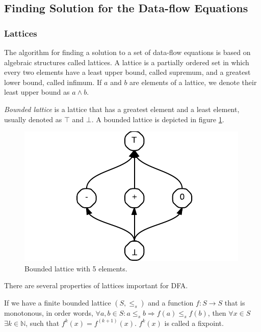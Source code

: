         \subsection{Finding Solution for the Data-flow Equations}
        
        \subsubsection*{Lattices}
        The algorithm for finding a solution to a set of data-flow 
        equations is based on algebraic structures called lattices. 
        A lattice is a partially ordered set in which every 
        two elements have a least upper bound, called supremum, 
        and a greatest lower bound, called infimum. If $a$ and 
        $b$ are elements of a lattice, we denote their least upper 
        bound as $a\wedge{}b$.
        
        \emph{Bounded lattice} is a lattice that has 
        a greatest element and a least element, 
        usually denoted as $\top$ and $\bot$. 
        A bounded lattice is depicted in figure \ref{lattice}.       
        
\begin{figure}[h]  
  \centering
    \includegraphics{img/lattice.pdf}
  \caption{Bounded lattice with 5 elements.\label{lattice}}    
\end{figure}

        There are several properties of lattices important for DFA.
        
        If we have a finite bounded lattice $(S, \leq_{s})$ and a function 
        $f:S\rightarrow{S}$ that is monotonous, in order words, 
        $\forall{a,b\in{S}}: a\leq_s{b} \Rightarrow f(a)\leq_s{f(b)}$, 
        then $\forall{x\in{S}}$ $\exists{k\in\mathbb{N}}$, such that 
        $f^k(x)=f^{(k+1)}(x)$. $f^k(x)$ is called a fixpoint.
        
